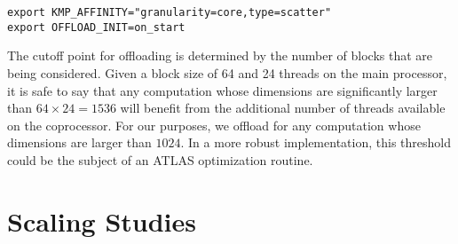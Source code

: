 \documentclass{scrartcl}
\begin{document}
  \begin{lstlisting}
export KMP_AFFINITY="granularity=core,type=scatter"
export OFFLOAD_INIT=on_start
  \end{lstlisting}

  The cutoff point for offloading is determined by the number of blocks that are being considered. Given a block size of 64 and 24 threads on the main processor, it is safe to say that any computation whose dimensions are significantly larger than $64 \times 24 = 1536$ will benefit from the additional number of threads available on the coprocessor. For our purposes, we offload for any computation whose dimensions are larger than $1024$. In a more robust implementation, this threshold could be the subject of an ATLAS optimization routine.
  \section{Scaling Studies}
\end{document}
